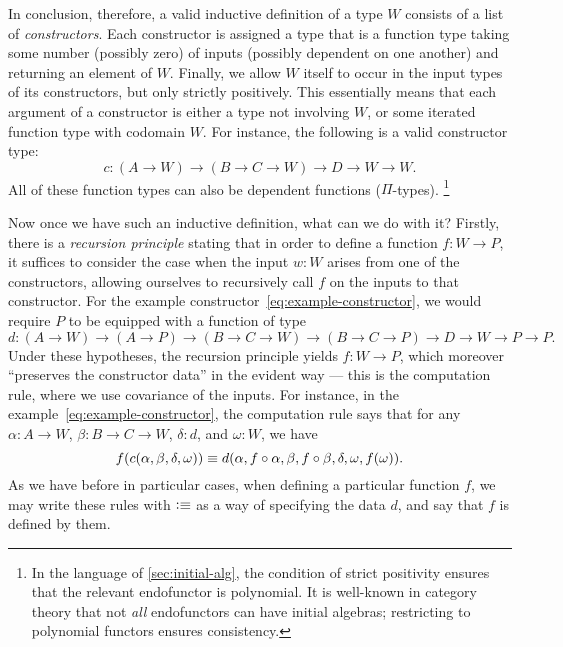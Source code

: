 In conclusion, therefore, a valid inductive definition of a type $W$ consists of a list of \emph{constructors}.
Each constructor is assigned a type that is a function type taking some number (possibly zero) of inputs (possibly dependent on one another) and returning an element of $W$.
Finally, we allow $W$ itself to occur in the input types of its constructors, but only strictly positively.
This essentially means that each argument of a constructor is either a type not involving $W$, or some iterated function type with codomain $W$.
For instance, the following is a valid constructor type:
\begin{equation}
  c:(A\to W) \to (B\to C \to W) \to D \to W \to W.\label{eq:example-constructor}
\end{equation}
All of these function types can also be dependent functions ($\Pi$-types).%
\footnote{In the language of \autoref{sec:initial-alg}, the condition of strict positivity ensures that the relevant endofunctor is polynomial.
It is well-known in category theory that not \emph{all} endofunctors can have initial algebras; restricting to polynomial functors ensures consistency.}

Now once we have such an inductive definition, what can we do with it?
Firstly, there is a \emph{recursion principle} stating that in order to define a function $f:W\to P$, it suffices to consider the case when the input $w:W$ arises from one of the constructors, allowing ourselves to recursively call $f$ on the inputs to that constructor.
For the example constructor~\eqref{eq:example-constructor}, we would require $P$ to be equipped with a function of type
\begin{equation}\label{eq:example-rechyp}
  d:(A\to W) \to (A\to P) \to (B\to C\to W) \to (B\to C \to P) \to D \to W \to P \to P.
\end{equation}
Under these hypotheses, the recursion principle yields $f:W\to P$, which moreover ``preserves the constructor data'' in the evident way --- this is the computation rule, where we use covariance of the inputs.
For instance, in the example~\eqref{eq:example-constructor}, the computation rule says that for any $\alpha:A\to W$, $\beta:B\to C\to W$, $\delta:d$, and $\omega:W$, we have
\begin{equation}
  f(c(\alpha,\beta,\delta,\omega)) \jdeq d(\alpha,f\circ \alpha,\beta, f\circ \beta, \delta, \omega,f(\omega)).\label{eq:example-comp}
\end{equation}
As we have before in particular cases, when defining a particular function $f$, we may write these rules with $\vcentcolon\equiv$ as a way of specifying the data $d$, and say that $f$ is defined by them.

